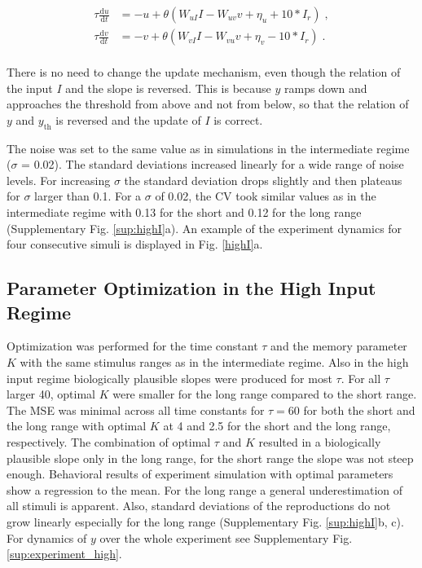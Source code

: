 \documentclass[10pt]{article}
\begin{document}
\begin{equation} \label{highI}
	\begin{split}
	\tau\frac{\text{d}u}{\text{d}t} & = -u + \theta(W_{uI}I - W_{uv}v + \eta_u + 10*I_r) \;,\\
	\tau\frac{\text{d}v}{\text{d}t} & = -v + \theta(W_{vI}I - W_{vu}v + \eta_v - 10*I_r) \;.\\
	\end{split}
\end{equation}

There is no need to change the update mechanism, even though the relation of the input $I$ and the slope is reversed. This is because $y$ ramps down and approaches the threshold from above and not from below, so that the relation of $y$ and $y_{\text{th}}$ is reversed and the update of $I$ is correct. 

The noise was set to the same value as in simulations in the intermediate regime ($\sigma$ = 0.02). The standard deviations increased linearly for a wide range of noise levels. For increasing $\sigma$ the standard deviation drops slightly and then plateaus for $\sigma$ larger than 0.1. For a $\sigma$ of 0.02, the CV took similar values as in the intermediate regime with 0.13 for the short and 0.12 for the long range (Supplementary Fig. \ref{sup:highI}a). 
An example of the experiment dynamics for four consecutive simuli is displayed in Fig. \ref{highI}a.

\subsection{Parameter Optimization in the High Input Regime}
Optimization was performed for the time constant $\tau$ and the memory parameter $K$ with the same stimulus ranges as in the intermediate regime. 
Also in the high input regime biologically plausible slopes were produced for most $\tau$. 
For all $\tau$ larger 40, optimal $K$ were smaller for the long range compared to the short range.
The MSE was minimal across all time constants for $\tau = 60$ for both the short and the long range with optimal $K$ at  4 and 2.5 for the short and the long range, respectively. The combination of optimal $\tau$ and $K$ resulted in a biologically plausible slope only in the long range, for the short range the slope was not steep enough. 
Behavioral results of experiment simulation with optimal parameters show a regression to the mean. For the long range a general underestimation of all stimuli is apparent. Also, standard deviations of the reproductions do not grow linearly especially for the long range (Supplementary Fig. \ref{sup:highI}b, c).
For dynamics of $y$ over the whole experiment see Supplementary Fig. \ref{sup:experiment_high}.
\end{document}

